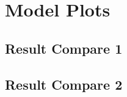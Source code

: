 \chapter{Model Plots}

\section{Result Compare 1}


\pagebreak

\section{Result Compare 2}


\pagebreak